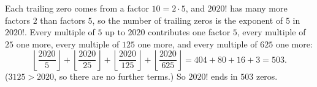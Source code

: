Each trailing zero comes from a factor $10=2\cdot5$, and $2020!$ has many more factors $2$ than factors $5$, so the number of trailing zeros is the exponent of $5$ in $2020!$. Every multiple of $5$ up to $2020$ contributes one factor $5$, every multiple of $25$ one more, every multiple of $125$ one more, and every multiple of $625$ one more:
\[\left\lfloor\dfrac{2020}{5}\right\rfloor+\left\lfloor\dfrac{2020}{25}\right\rfloor+\left\lfloor\dfrac{2020}{125}\right\rfloor+\left\lfloor\dfrac{2020}{625}\right\rfloor=404+80+16+3=503.\]
($3125>2020$, so there are no further terms.) So $2020!$ ends in $\boxed{503}$ zeros.
